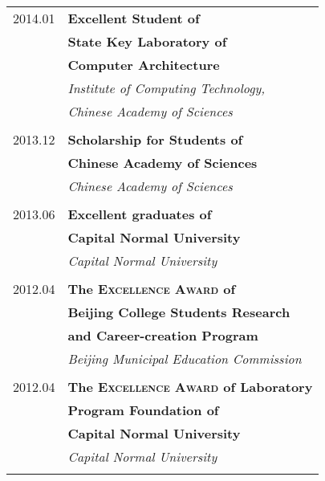\documentclass[10pt,a4paper]{article} %
\begin{document}
\begin{minipage}[t]{0.44\textwidth}
\begin{tabular}{rl}
2014.01     &\small\textbf{Excellent Student of}\\
& \small\textbf{ State Key Laboratory of}\\
& \small\textbf{ \quad Computer Architecture}\\
& \small\textit{Institute of Computing Technology,}\\
& \small\textit{ Chinese Academy of Sciences}\\\\
2013.12     &\small\textbf{Scholarship for Students of}\\
& \small\textbf{ Chinese Academy of Sciences}\\
& \small\textit{Chinese Academy of Sciences}\\ \\

2013.06     &\small\textbf{Excellent graduates of}\\
& \small\textbf{ Capital Normal University}\\
& \small\textit{Capital Normal University}\\ \\
2012.04     & \small\textbf{The \textsc{Excellence Award}  of   }\\
& \small\textbf{ Beijing College Students Research  }\\
& \small\textbf{ and Career-creation Program}\\
& \small\textit{Beijing Municipal Education Commission}\\ \\

2012.04     & \small\textbf{The \textsc{Excellence Award} of Laboratory }\\
& \small\textbf{ Program Foundation of  }\\
& \small\textbf{ Capital Normal University}\\
& \small\textit{Capital Normal University}\\ \\


\end{tabular}
\end{minipage}
\end{document}

